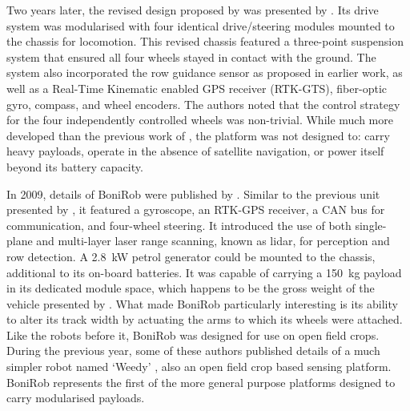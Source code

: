 \documentclass[preprint,authoryear,12pt]{elsarticle}
\begin{document}
        Two years later, the revised design proposed by \cite{Pedersen2002} was presented by \cite{Bak2004}.
        Its drive system was modularised with four identical drive/steering modules mounted to the chassis for locomotion.
        This revised chassis featured a three-point suspension system that ensured all four wheels stayed in contact with the ground.
        The system also incorporated the row guidance sensor as proposed in earlier work, as well as a Real-Time Kinematic enabled GPS receiver (RTK-GTS), fiber-optic gyro, compass, and wheel encoders.
        The authors noted that the control strategy for the four independently controlled wheels was non-trivial.
        While much more developed than the previous work of \cite{Pedersen2002}, the platform was not designed to: carry heavy payloads, operate in the absence of satellite navigation, or power itself beyond its battery capacity.


        In 2009, details of BoniRob were published by \cite{Ruckelshausen2009}.
        Similar to the previous unit presented by \cite{Bak2004}, it featured a gyroscope, an RTK-GPS receiver, a CAN bus for communication, and four-wheel steering.
        It introduced the use of both single-plane and multi-layer laser range scanning, known as lidar, for perception and row detection.
        A \SI{2.8}{\kilo\watt} petrol generator could be mounted to the chassis, additional to its on-board batteries.
        It was capable of carrying a \SI{150}{\kilo\gram} payload in its dedicated module space, which happens to be the gross weight of the vehicle presented by \cite{Bak2004}.
        What made BoniRob particularly interesting is its ability to alter its track width by actuating the arms to which its wheels were attached.
        Like the robots before it, BoniRob was designed for use on open field crops.
        During the previous year, some of these authors published details of a much simpler robot named `Weedy' \citep{Klose2008}, also an open field crop based sensing platform.
        BoniRob represents the first of the more general purpose platforms designed to carry modularised payloads.
\end{document}
